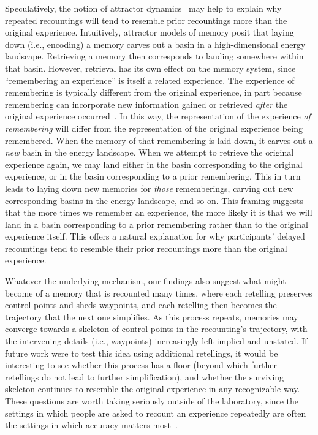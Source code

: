 \documentclass[10pt]{article}
\begin{document}
Speculatively, the notion of attractor dynamics~\citep{Hopf82} may help to explain why repeated recountings will tend to resemble prior recountings more than the original experience.
Intuitively, attractor models of memory posit that laying down (i.e., encoding) a memory carves out a basin in a high-dimensional energy landscape.
Retrieving a memory then corresponds to landing somewhere within that basin.
However, retrieval has its own effect on the memory system, since ``remembering an experience'' is itself a related experience.
The experience of remembering is typically different from the original experience, in part because remembering can incorporate new information gained or retrieved \textit{after} the original experience occurred~\citep{Mann21a,Mann24}.
In this way, the representation of the experience \textit{of remembering} will differ from the representation of the original experience being remembered.
When the memory of that remembering is laid down, it carves out a \textit{new} basin in the energy landscape.
When we attempt to retrieve the original experience again, we may land either in the basin corresponding to the original experience, or in the basin corresponding to a prior remembering.
This in turn leads to laying down new memories for \textit{those} rememberings, carving out new corresponding basins in the energy landscape, and so on.
This framing suggests that the more times we remember an experience, the more likely it is that we will land in a basin corresponding to a prior remembering rather than to the original experience itself.
This offers a natural explanation for why participants' delayed recountings tend to resemble their prior recountings more than the original experience.

Whatever the underlying mechanism, our findings also suggest what might become of a memory that is recounted many times, where each retelling preserves control points and sheds waypoints, and each retelling then becomes the trajectory that the next one simplifies.
As this process repeats, memories may converge towards a skeleton of control points in the recounting's trajectory, with the intervening details (i.e., waypoints) increasingly left implied and unstated.
If future work were to test this idea using additional retellings, it would be interesting to see whether this process has a floor (beyond which further retellings do not lead to further simplification), and whether the surviving skeleton continues to resemble the original experience in any recognizable way.
These questions are worth taking seriously outside of the laboratory, since the settings in which people are asked to recount an experience repeatedly are often the settings in which accuracy matters most~\citep[e.g., eyewitness testimony; ][]{ChanEtal09b}.
\end{document}
